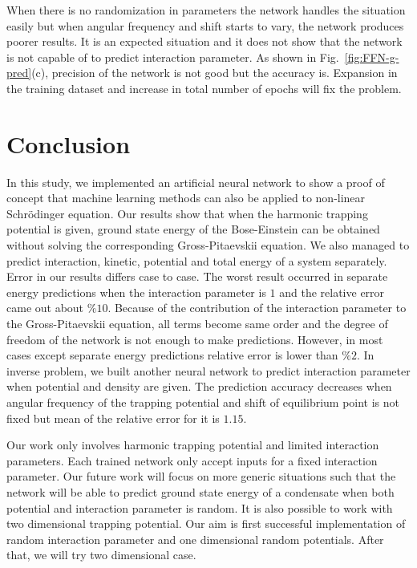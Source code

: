\documentclass[a4paper,times,12pt]{article}
\begin{document}
When there is no randomization in parameters the network handles the situation easily but when angular frequency and shift starts to vary, the network produces poorer results. It is an expected situation and it does not show that the network is not capable of to predict interaction parameter. As shown in Fig.~\ref{fig:FFN-g-pred}(c), precision of the network is not good but the accuracy is. Expansion in the training dataset and increase in total number of epochs will fix the problem.

\clearpage
\section{Conclusion}

In this study, we implemented an artificial neural network to show a proof of concept that machine learning methods can also be applied to non-linear Schr{\"o}dinger equation. Our results show that when the harmonic trapping potential is given, ground state energy of the Bose-Einstein can be obtained without solving the corresponding Gross-Pitaevskii equation. We also managed to predict interaction, kinetic, potential and total energy of a system separately. Error in our results differs case to case. The worst result occurred in separate energy predictions when the interaction parameter is $1$ and the relative error came out about $\%10$. Because of the contribution of the interaction parameter to the Gross-Pitaevskii equation, all terms become same order and the degree of freedom of the network is not enough to make predictions. However, in most cases except separate energy predictions relative error is lower than $\%2$. In inverse problem, we built another neural network to predict interaction parameter when potential and density are given. The prediction accuracy decreases when angular frequency of the trapping potential and shift of equilibrium point is not fixed but mean of the relative error for it is $1.15$.

Our work only involves harmonic trapping potential and limited interaction parameters. Each trained network only accept inputs for a fixed interaction parameter. Our future work will focus on more generic situations such that the network will be able to predict ground state energy of a condensate when both potential and interaction parameter is random. It is also possible to work with two dimensional trapping potential. Our aim is first successful implementation of random interaction parameter and one dimensional random potentials. After that, we will try two dimensional case. 
\end{document}
